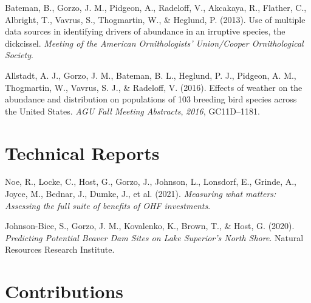 \documentclass[11pt,a4paper,]{moderncv}
\newlength{\cslhangindent}
\newenvironment{CSLReferences}[2] %
 {\begin{list}{}{%
  \setlength{\itemindent}{0pt}
  \setlength{\leftmargin}{0pt}
  \setlength{\parsep}{0pt}
  \ifodd #1
   \setlength{\leftmargin}{\cslhangindent}
   \setlength{\itemindent}{-1\cslhangindent}
  \fi
  \setlength{\itemsep}{#2\baselineskip}}}
 {\end{list}}
\begin{document}
\begin{CSLReferences}{1}{0}
Bateman, B., Gorzo, J. M., Pidgeon, A., Radeloff, V., Akcakaya, R.,
Flather, C., Albright, T., Vavrus, S., Thogmartin, W., \& Heglund, P.
(2013). Use of multiple data sources in identifying drivers of abundance
in an irruptive species, the dickcissel. \emph{Meeting of the American
Ornithologists' Union/Cooper Ornithological Society}.

Allstadt, A. J., Gorzo, J. M., Bateman, B. L., Heglund, P. J., Pidgeon,
A. M., Thogmartin, W., Vavrus, S. J., \& Radeloff, V. (2016). Effects of
weather on the abundance and distribution on populations of 103 breeding
bird species across the United States. \emph{AGU Fall Meeting
Abstracts}, \emph{2016}, GC11D--1181.

\end{CSLReferences}

\section{Technical Reports}\label{technical-reports}

\label{refs-972c61dc0a31e77772ca1bd1a185967e}
\begin{CSLReferences}{1}{0}
Noe, R., Locke, C., Host, G., Gorzo, J., Johnson, L., Lonsdorf, E.,
Grinde, A., Joyce, M., Bednar, J., Dumke, J., et al. (2021).
\emph{Measuring what matters: Assessing the full suite of benefits of
OHF investments}.

Johnson-Bice, S., Gorzo, J. M., Kovalenko, K., Brown, T., \& Host, G.
(2020). \emph{Predicting Potential Beaver Dam Sites on Lake Superior's
North Shore}. Natural Resources Research Institute.

\end{CSLReferences}

\section{Contributions}\label{contributions}
\end{document}

